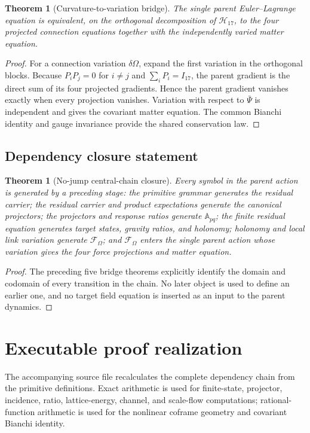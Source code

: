 \documentclass[11pt]{article}
\numberwithin{equation}{section}
\newtheorem{theorem}[definition]{Theorem}
\theoremstyle{remark}
\begin{document}
\begin{theorem}[Curvature-to-variation bridge]
The single parent Euler--Lagrange equation is equivalent, on the orthogonal decomposition of $\mathcal H_{17}$, to the four projected connection equations together with the independently varied matter equation.
\end{theorem}
\begin{proof}
For a connection variation $\delta\Omega$, expand the first variation in the orthogonal blocks. Because $P_iP_j=0$ for $i\ne j$ and $\sum_iP_i=I_{17}$, the parent gradient is the direct sum of its four projected gradients. Hence the parent gradient vanishes exactly when every projection vanishes. Variation with respect to $\bar\Psi$ is independent and gives the covariant matter equation. The common Bianchi identity and gauge invariance provide the shared conservation law.
\end{proof}

\subsection{Dependency closure statement}
\begin{theorem}[No-jump central-chain closure]
Every symbol in the parent action is generated by a preceding stage: the primitive grammar generates the residual carrier; the residual carrier and product expectations generate the canonical projectors; the projectors and response ratios generate $\mathbb A_{pq}$; the finite residual equation generates target states, gravity ratios, and holonomy; holonomy and local link variation generate $\mathcal F_\Omega$; and $\mathcal F_\Omega$ enters the single parent action whose variation gives the four force projections and matter equation.
\end{theorem}
\begin{proof}
The preceding five bridge theorems explicitly identify the domain and codomain of every transition in the chain. No later object is used to define an earlier one, and no target field equation is inserted as an input to the parent dynamics.
\end{proof}


\section{Executable proof realization}
\label{sec:certificate}
The accompanying source file recalculates the complete dependency chain from the primitive definitions. Exact arithmetic is used for finite-state, projector, incidence, ratio, lattice-energy, channel, and scale-flow computations; rational-function arithmetic is used for the nonlinear coframe geometry and covariant Bianchi identity.
\end{document}
